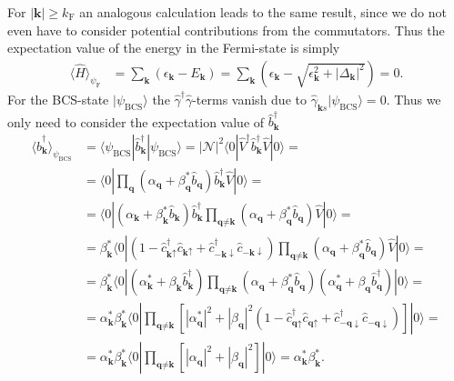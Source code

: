 \documentclass[english, parskip=full]{scrartcl}
\renewcommand{\bra}{}
\renewcommand{\braket}{}
\newcommand{\kla}{}
\newcommand{\klam}{}
\newcommand{\tecxt}{}
\newcommand{\Ket}{}
\begin{document}
For $|\textbf{k}| \ge k_\tecxt\text{F}$ an analogous calculation leads to the same result, since we do not even have to consider potential contributions from the commutators.
Thus the expectation value of the energy in the Fermi-state is simply
\begin{align}
\bra\langle \hat{H} \rangle_{\psi_\tecxt\text{F}} &= \sum_\textbf{k} \kla\left( \epsilon_\textbf{k} - E_\textbf{k} \right) = \sum_\textbf{k} \kla\left( \epsilon_\textbf{k} - \sqrt{\epsilon_\textbf{k}^2 + |\Delta_\textbf{k}|^2} \right) = 0.
\end{align}
For the BCS-state $\Ket | \psi_\tecxt\text{BCS} \rangle$ the $\hat{\gamma}^\dagger\hat{\gamma}$-terms vanish due to $\hat{\gamma}_{\textbf{k}s} \Ket | \psi_\tecxt\text{BCS} \rangle = 0$.
Thus we only need to consider the expectation value of $\hat{b}_\textbf{k}^\dagger$
\begin{align}
\bra\langle \hat{b}_\textbf{k}^\dagger \rangle_{\psi_\tecxt\text{BCS}} &= \braket\langle \psi_\tecxt\text{BCS} | \hat{b}_\textbf{k}^\dagger | \psi_\tecxt\text{BCS} \rangle = |\mathcal{N}|^2 \braket\langle 0 | \hat{V}^\dagger \hat{b}_\textbf{k}^\dagger \hat{V} | 0 \rangle = \\
&= \braket\langle 0 | \prod_\textbf{q} \left( \alpha_\textbf{q} + \beta_\textbf{q}^\ast \hat{b}_\textbf{q} \right) \hat{b}_\textbf{k}^\dagger \hat{V} | 0 \rangle = \\
&= \braket\langle 0 | \left( \alpha_\textbf{k} + \beta_\textbf{k}^\ast \hat{b}_\textbf{k} \right) \hat{b}_\textbf{k}^\dagger  \prod_{\textbf{q} \neq \textbf{k}} \left( \alpha_\textbf{q} + \beta_\textbf{q}^\ast \hat{b}_\textbf{q} \right) \hat{V}  | 0 \rangle = \\
&= \beta^\ast_\textbf{k}\braket\langle 0 | \kla\left( 1 - \hat{c}_{\textbf{k}\uparrow}^\dagger \hat{c}_{\textbf{k}\uparrow} +  \hat{c}_{-\textbf{k}\downarrow}^\dagger \hat{c}_{-\textbf{k}\downarrow} \right)  \prod_{\textbf{q} \neq \textbf{k}} \left( \alpha_\textbf{q} + \beta_\textbf{q}^\ast \hat{b}_\textbf{q} \right) \hat{V} | 0 \rangle  = \\
&= \beta_\textbf{k}^\ast \braket\langle 0 | \left( \alpha_\textbf{k}^\ast + \beta_\textbf{k} \hat{b}_\textbf{k}^\dagger \right) \prod_{\textbf{q} \neq \textbf{k}} \left( \alpha_\textbf{q} + \beta_\textbf{q}^\ast \hat{b}_\textbf{q} \right) \left( \alpha_\textbf{q}^\ast + \beta_\textbf{q} \hat{b}_\textbf{q}^\dagger \right) | 0 \rangle = \\
&= \alpha_\textbf{k}^\ast \beta_\textbf{k}^\ast \braket\langle 0 | \prod_{\textbf{q} \neq \textbf{k}} \klam\left[ |\alpha_\textbf{q}^\ast|^2 + |\beta_\textbf{q}|^2 \kla\left( 1 - \hat{c}_{\textbf{q}\uparrow}^\dagger \hat{c}_{\textbf{q}\uparrow} +  \hat{c}_{-\textbf{q}\downarrow}^\dagger \hat{c}_{-\textbf{q}\downarrow} \right) \right] | 0 \rangle = \\
&= \alpha_\textbf{k}^\ast \beta_\textbf{k}^\ast \braket\langle 0 | \prod_{\textbf{q} \neq \textbf{k}} \klam\left[ |\alpha_\textbf{q}|^2 + |\beta_\textbf{q}|^2 \right] | 0 \rangle = \alpha_\textbf{k}^\ast \beta_\textbf{k}^\ast.
\end{align}
\end{document}
